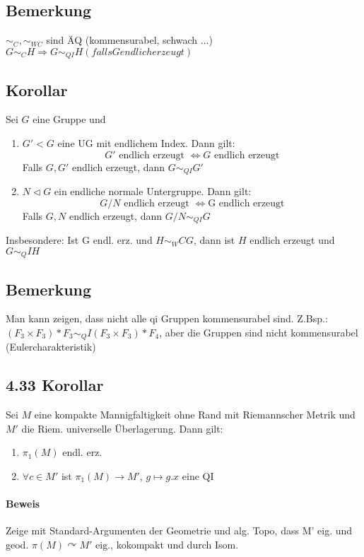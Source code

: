 \documentclass{article}
\begin{document}
\subsection{Bemerkung}
$\sim_C, \sim_{WC}$ sind ÄQ (kommensurabel, schwach ...)
$G\sim_C H \Longrightarrow G\sim_{QI}H (falls G endlich erzeugt)$

\subsection{Korollar}
Sei $G$ eine Gruppe und 
\begin{enumerate}
	\item $G' < G$ eine UG mit endlichem Index. Dann gilt:
	\[G' \text{ endlich erzeugt } \Longleftrightarrow G \text{ endlich erzeugt} \]
	Falls $G,G'$ endlich erzeugt, dann $G \sim_{QI} G'$
	\item $N \vartriangleleft G$ ein endliche normale Untergruppe. Dann gilt:
	\[G/ N \text{ endlich erzeugt } \Longleftrightarrow \text{G endlich erzeugt} \]
	Falls $G,N$ endlich erzeugt, dann $G/N \sim_{QI} G$
\end{enumerate}
Insbesondere: Ist G endl. erz. und $H \sim_WC G$, dann ist $H$ endlich erzeugt und $G\sim_QI H$
\subsection{Bemerkung}
Man kann zeigen, dass nicht alle qi Gruppen kommensurabel sind. Z.Bsp.: $(F_3\times F_3)* F_3 \sim_QI (F_3\times F_3)*F_4$, aber die Gruppen sind nicht kommensurabel (Eulercharakteristik)

\subsection{4.33 Korollar}
Sei $M$ eine kompakte Mannigfaltigkeit ohne Rand mit Riemannscher Metrik und $M'$ die Riem. universelle Überlagerung. Dann gilt:
\begin{enumerate}
	\item $\pi_1(M)$ endl. erz.
	\item $\forall c \in M'$ ist $\pi_1(M) \rightarrow M'$, $g\longmapsto g.x$ eine QI
\end{enumerate}
\paragraph{Beweis}
Zeige mit Standard-Argumenten der Geometrie und alg. Topo, dass M' eig. und geod.
$\pi(M) \curvearrowright M'$ eig., kokompakt und durch Isom.
\end{document}
